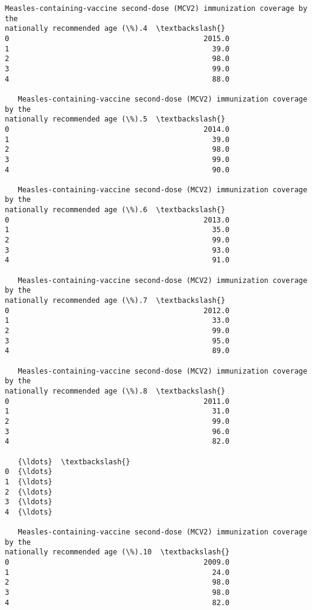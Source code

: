 \documentclass[11pt]{article}
\begin{document}
\begin{tcolorbox}[breakable, size=fbox, boxrule=.5pt, pad at break*=1mm, opacityfill=0]
\begin{Verbatim}[commandchars=\\\{\}]
   Measles-containing-vaccine second-dose (MCV2) immunization coverage by the
nationally recommended age (\%).4  \textbackslash{}
0                                             2015.0
1                                               39.0
2                                               98.0
3                                               99.0
4                                               88.0

   Measles-containing-vaccine second-dose (MCV2) immunization coverage by the
nationally recommended age (\%).5  \textbackslash{}
0                                             2014.0
1                                               39.0
2                                               98.0
3                                               99.0
4                                               90.0

   Measles-containing-vaccine second-dose (MCV2) immunization coverage by the
nationally recommended age (\%).6  \textbackslash{}
0                                             2013.0
1                                               35.0
2                                               99.0
3                                               93.0
4                                               91.0

   Measles-containing-vaccine second-dose (MCV2) immunization coverage by the
nationally recommended age (\%).7  \textbackslash{}
0                                             2012.0
1                                               33.0
2                                               99.0
3                                               95.0
4                                               89.0

   Measles-containing-vaccine second-dose (MCV2) immunization coverage by the
nationally recommended age (\%).8  \textbackslash{}
0                                             2011.0
1                                               31.0
2                                               99.0
3                                               96.0
4                                               82.0

   {\ldots}  \textbackslash{}
0  {\ldots}
1  {\ldots}
2  {\ldots}
3  {\ldots}
4  {\ldots}

   Measles-containing-vaccine second-dose (MCV2) immunization coverage by the
nationally recommended age (\%).10  \textbackslash{}
0                                             2009.0
1                                               24.0
2                                               98.0
3                                               98.0
4                                               82.0


\end{Verbatim}
\end{tcolorbox}
\end{document}
